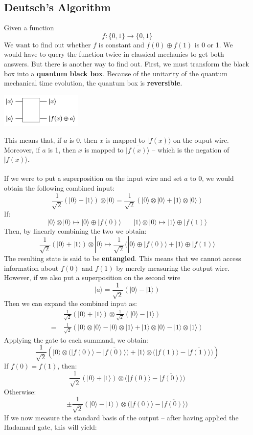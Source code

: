 \documentclass{article}
\begin{document}
\subsection{Deutsch's Algorithm}
Given a function
\[ f : \{ 0, 1 \} \rightarrow \{ 0, 1 \} \]
We want to find out whether $f$ is constant and $f(0) \oplus f(1)$ is 0 or 1. We would have to query the function twice in classical mechanics to get both answers. But there is another way to find out. First, we must transform the black box into a \textbf{quantum black box}. Because of the unitarity of the quantum mechanical time evolution, the quantum box is \textbf{reversible}.

\begin{center}
	\includegraphics[width=4cm]{assets/deutsch.png}
\end{center}
This means that, if $a$ is 0, then $x$ is mapped to $|f(x)\rangle$ on the ouput wire. Moreover, if $a$ is 1, then $x$ is mapped to $\overline{|f(x)\rangle}$ -- which is the negation of $|f(x)\rangle$. \\ \\
If we were to put a superposition on the input wire and set $a$ to 0, we would obtain the following combined input:
\[ \frac{1}{\sqrt{2}}(|0\rangle + |1\rangle) \otimes |0\rangle = \frac{1}{\sqrt{2}} (|0\rangle \otimes |0\rangle + |1\rangle \otimes |0\rangle) \]
If:
\[ |0\rangle \otimes |0\rangle \mapsto |0\rangle \oplus |f(0)\rangle ~~~~~~~~ |1\rangle \otimes |0\rangle \mapsto |1\rangle \oplus |f(1)\rangle \]
Then, by linearly combining the two we obtain:
\[ \frac{1}{\sqrt{2}}(|0\rangle + |1\rangle) \otimes |0\rangle \mapsto \frac{1}{\sqrt{2}}(|0\rangle \oplus |f(0)\rangle + |1\rangle \oplus |f(1)\rangle \]
The resulting state is said to be \textbf{entangled}. This means that we cannot access information about $f(0)$ and $f(1)$ by merely measuring the output wire. However, if we also put a superposition on the second wire
\[ |a\rangle = \frac{1}{\sqrt{2}}(|0\rangle - |1\rangle) \]
Then we can expand the combined input as:
\begin{align*}
	& \frac{1}{\sqrt{2}}(|0\rangle + |1\rangle) \otimes \frac{1}{\sqrt{2}}(|0\rangle - |1\rangle) \\
	=~& \frac{1}{\sqrt{2}}(|0\rangle \otimes |0\rangle - |0\rangle \otimes |1\rangle + |1\rangle \otimes |0\rangle  - |1\rangle \otimes |1\rangle)
\end{align*}
Applying the gate to each summand, we obtain:
\[ \frac{1}{\sqrt{2}} \left( |0\rangle \otimes \big( |f(0)\rangle - \overline{|f(0)\rangle} \big) + |1\rangle \otimes \big( |f(1)\rangle - \overline{|f(1)\rangle} \big) \right) \]
If $f(0) = f(1)$, then:
\[ \frac{1}{\sqrt{2}}(|0\rangle + |1\rangle) \otimes \big( |f(0)\rangle - \overline{|f(0)\rangle} \big) \]
Otherwise:
\[ \pm \frac{1}{\sqrt{2}}(|0\rangle - |1\rangle) \otimes \big( |f(0)\rangle - \overline{|f(0)\rangle} \big) \]
If we now measure the standard basis of the output -- after having applied the Hadamard gate, this will yield:
\end{document}

